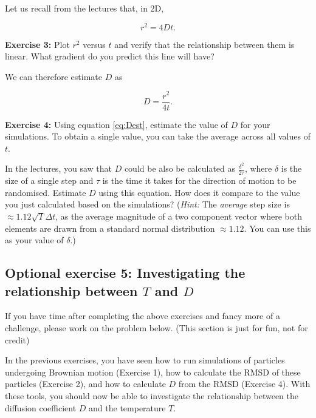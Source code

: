 \documentclass[11pt, oneside]{article}
\begin{document}
	Let us recall from the lectures that, in 2D,
	
	\begin{equation}
		r^2 = 4Dt.
	\end{equation}
	
	\bigskip
	
	\textbf{Exercise 3:} Plot $r^2$ versus $t$ and verify that the relationship between them is linear. What gradient do you predict this line will have?
	
	\bigskip
	
	We can therefore estimate $D$ as 
	
	\begin{equation}
		D = \frac{r^2}{4t}.
		\label{eq:Dest}
	\end{equation}
	
	\bigskip
	
	\textbf{Exercise 4:} Using equation \ref{eq:Dest}, estimate the value of $D$ for your simulations. To obtain a single value, you can take the average across all values of $t$. 
	
	In the lectures, you saw that $D$ could be also be calculated as $\frac{\delta^2}{2\tau}$, where $\delta$ is the size of a single step and $\tau$ is the time it takes for the direction of motion to be randomised. Estimate $D$ using this equation. How does it compare to the value you just calculated based on the simulations? (\textit{Hint:} The \textit{average} step size is $\approx 1.12 \sqrt{T} \Delta t$, as the average magnitude of a two component vector where both elements are drawn from a standard normal distribution $\approx 1.12$. You can use this as your value of $\delta$.) 
	
	\bigskip
	
	\subsection{Optional exercise 5: Investigating the relationship between $T$ and $D$}
	
	If you have time after completing the above exercises and fancy more of a challenge, please work on the problem below. (This section is just for fun, not for credit)
	
	In the previous exercises, you have seen how to run simulations of particles undergoing Brownian motion (Exercise 1), how to calculate the RMSD of these particles (Exercise 2), and how to calculate $D$ from the RMSD (Exercise 4). With these tools, you should now be able to investigate the relationship between the diffusion coefficient $D$ and the temperature $T$. 
	
\end{document}
